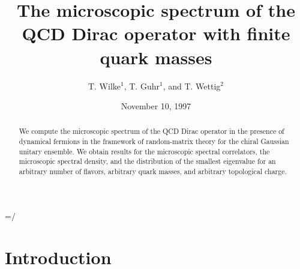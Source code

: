 
\makeatletter
\newbox\slashbox \setbox\slashbox=\hbox{\large$/$}
\def\pslash#1{\setbox\@tempboxa=\hbox{$#1$}
  \@tempdima=0.5\wd\slashbox \advance\@tempdima 0.5\wd\@tempboxa
  \copy\slashbox \kern-\@tempdima \box\@tempboxa}
\def\slash{\protect\pslash}
\makeatother



\draft

\title{The microscopic spectrum of the QCD Dirac operator with finite
       quark masses}

\author{T. Wilke$^1$, T. Guhr$^1$, and T. Wettig$^2$}

\address{%
  $^1$Max Planck Institut f\"ur Kernphysik, Postfach 103980, D-69029
  Heidelberg, Germany\\ 
  $^2$Institut f\"ur Theoretische Physik, Technische Universit\"at
  M\"unchen, D-85747 Garching, Germany}

\date{November 10, 1997}

\maketitle

\begin{abstract}
  We compute the microscopic spectrum of the QCD Dirac operator in the
  presence of dynamical fermions in the framework of random-matrix
  theory for the chiral Gaussian unitary ensemble.  We obtain results
  for the microscopic spectral correlators, the microscopic spectral
  density, and the distribution of the smallest eigenvalue for an
  arbitrary number of flavors, arbitrary quark masses, and arbitrary
  topological charge.
\end{abstract}


\section{Introduction}
\label{sec1}

